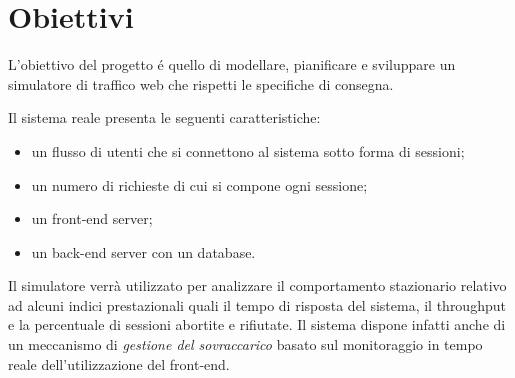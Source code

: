 \chapter{Obiettivi}
 	\label{cap:obiettivi}
 L'obiettivo del progetto \'e quello di modellare, pianificare e sviluppare un 
simulatore di traffico web che rispetti le specifiche di consegna.
 
\vspace{0.5 cm} \noindent Il sistema reale presenta le seguenti caratteristiche:
 \begin{itemize}
 \item un flusso di utenti che si connettono al sistema sotto forma di sessioni;
 \item un numero di richieste di cui si compone ogni sessione;
 \item un front-end server;
 \item un back-end server con un database.
 \end{itemize}

 Il simulatore verr\`a utilizzato per analizzare il comportamento stazionario 
relativo ad alcuni indici prestazionali quali il tempo di risposta del sistema, 
il throughput e la percentuale di sessioni abortite e rifiutate.
 Il sistema dispone infatti anche di un meccanismo di \emph{gestione del 
sovraccarico} basato sul monitoraggio in tempo reale dell'utilizzazione del 
front-end.\\